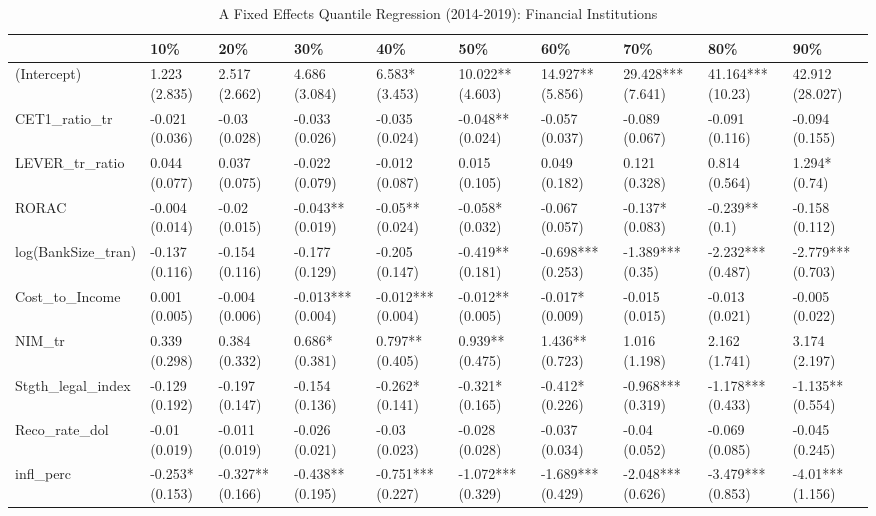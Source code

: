 \begin{table}[ht]
\centering
\caption{A Fixed Effects Quantile Regression (2014-2019): Financial Institutions} 
\begingroup\small
\begin{tabular}{llllllllll}
  \toprule
 & 10\% & 20\% & 30\% & 40\% & 50\% & 60\% & 70\% & 80\% & 90\% \\ 
  \midrule
(Intercept) & 1.223 (2.835) & 2.517 (2.662) & 4.686 (3.084) & 6.583* (3.453) & 10.022** (4.603) & 14.927** (5.856) & 29.428*** (7.641) & 41.164*** (10.23) & 42.912 (28.027) \\ 
  CET1\_ratio\_tr & -0.021 (0.036) & -0.03 (0.028) & -0.033 (0.026) & -0.035 (0.024) & -0.048** (0.024) & -0.057 (0.037) & -0.089 (0.067) & -0.091 (0.116) & -0.094 (0.155) \\ 
  LEVER\_tr\_ratio & 0.044 (0.077) & 0.037 (0.075) & -0.022 (0.079) & -0.012 (0.087) & 0.015 (0.105) & 0.049 (0.182) & 0.121 (0.328) & 0.814 (0.564) & 1.294* (0.74) \\ 
  RORAC & -0.004 (0.014) & -0.02 (0.015) & -0.043** (0.019) & -0.05** (0.024) & -0.058* (0.032) & -0.067 (0.057) & -0.137* (0.083) & -0.239** (0.1) & -0.158 (0.112) \\ 
  log(BankSize\_tran) & -0.137 (0.116) & -0.154 (0.116) & -0.177 (0.129) & -0.205 (0.147) & -0.419** (0.181) & -0.698*** (0.253) & -1.389*** (0.35) & -2.232*** (0.487) & -2.779*** (0.703) \\ 
  Cost\_to\_Income & 0.001 (0.005) & -0.004 (0.006) & -0.013*** (0.004) & -0.012*** (0.004) & -0.012** (0.005) & -0.017* (0.009) & -0.015 (0.015) & -0.013 (0.021) & -0.005 (0.022) \\ 
  NIM\_tr & 0.339 (0.298) & 0.384 (0.332) & 0.686* (0.381) & 0.797** (0.405) & 0.939** (0.475) & 1.436** (0.723) & 1.016 (1.198) & 2.162 (1.741) & 3.174 (2.197) \\ 
  Stgth\_legal\_index & -0.129 (0.192) & -0.197 (0.147) & -0.154 (0.136) & -0.262* (0.141) & -0.321* (0.165) & -0.412* (0.226) & -0.968*** (0.319) & -1.178*** (0.433) & -1.135** (0.554) \\ 
  Reco\_rate\_dol & -0.01 (0.019) & -0.011 (0.019) & -0.026 (0.021) & -0.03 (0.023) & -0.028 (0.028) & -0.037 (0.034) & -0.04 (0.052) & -0.069 (0.085) & -0.045 (0.245) \\ 
  infl\_perc & -0.253* (0.153) & -0.327** (0.166) & -0.438** (0.195) & -0.751*** (0.227) & -1.072*** (0.329) & -1.689*** (0.429) & -2.048*** (0.626) & -3.479*** (0.853) & -4.01*** (1.156) \\ 

\end{tabular}
\end{table}
